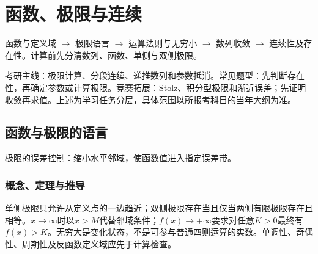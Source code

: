 \chapter{函数、极限与连续}\label{ch:1}
\begin{tcolorbox}[title=章首知识地图,colframe=Ink]
函数与定义域 $\to$ 极限语言 $\to$ 运算法则与无穷小 $\to$ 数列收敛 $\to$ 连续性及存在性。计算前先分清数列、函数、单侧与双侧极限。
\end{tcolorbox}
\begin{examtip}考研主线：极限计算、分段连续、递推数列和参数抵消。常见题型：先判断存在性，再确定参数或计算极限。竞赛拓展：Stolz、积分型极限和渐近误差；先证明收敛再求值。上述为学习任务分层，具体范围以所报考科目的当年大纲为准。\end{examtip}
\section{函数与极限的语言}\label{sec:1:1}

\begin{center}
\par\small 极限的误差控制：缩小水平邻域，使函数值进入指定误差带。
\end{center}

\subsection{概念、定理与推导}

单侧极限只允许从定义点的一边趋近；双侧极限存在当且仅当两侧有限极限存在且相等。$x\to\infty$时以$x>M$代替邻域条件；$f(x)\to+\infty$要求对任意$K>0$最终有$f(x)>K$。无穷大是变化状态，不是可参与普通四则运算的实数。单调性、奇偶性、周期性及反函数定义域应先于计算检查。


